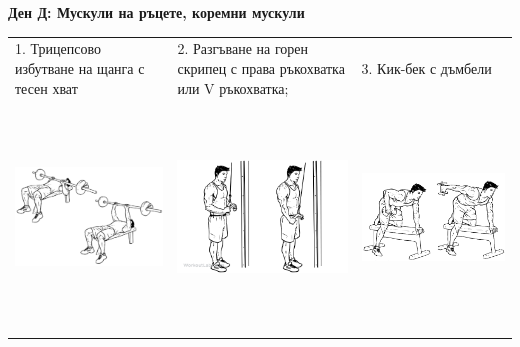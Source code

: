 \documentclass{article}
\begin{document}
\newpage
\textbf{Ден Д: Мускули на ръцете, коремни мускули}\\
\begin{tabular}{ | m{5cm} | m{5cm} | m{5cm} | }
\hline
1. Трицепсово избутване на щанга с тесен хват& 
2. Разгъване на горен скрипец с права ръкохватка или V ръкохватка;  & 
3. Кик-бек с дъмбели\\ 
\begin{minipage}{5cm} \includegraphics[width=\linewidth, height=60mm]{Close-Grip-Bench-Press.png} \end{minipage}&
\begin{minipage}{5cm} \includegraphics[width=\linewidth, height=60mm]{Triceps_Pushdown.png} \end{minipage}& 
\begin{minipage}{5cm} \includegraphics[width=\linewidth, height=60mm]{kick_back.png} \end{minipage} \\ 

\end{tabular}
\end{document}
